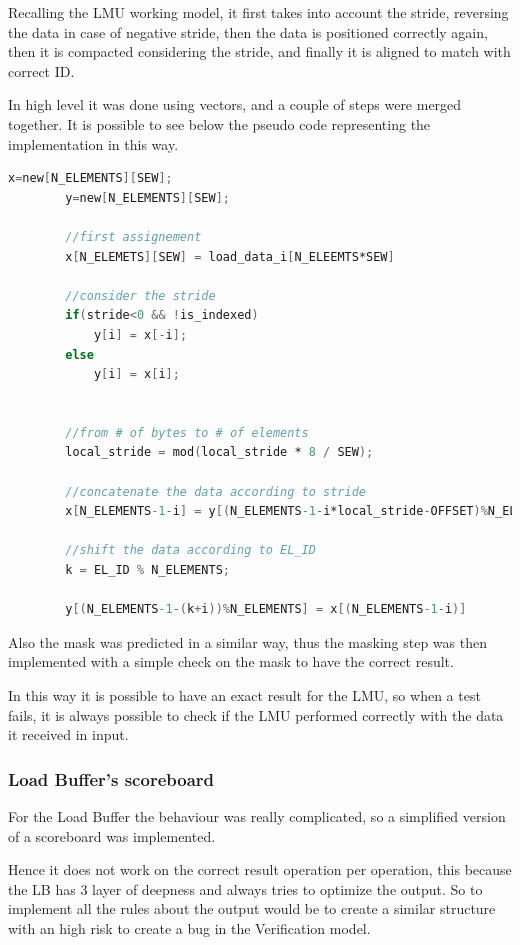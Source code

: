 Recalling the LMU working model, it first takes into account the stride, reversing the data in case of negative stride, then the data is positioned correctly again, then it is compacted considering the stride, and finally it is aligned to match with correct ID.

In high level it was done using vectors, and a couple of steps were merged together. It is possible to see below the pseudo code representing the implementation in this way.

\linespread{1}
\begin{lstlisting}[language=Verilog,style=verilog-style, backgroundcolor=\color{lyel_palette}, frame=tlb]
        x=new[N_ELEMENTS][SEW];
        y=new[N_ELEMENTS][SEW];

        //first assignement
        x[N_ELEMETS][SEW] = load_data_i[N_ELEEMTS*SEW]

        //consider the stride
        if(stride<0 && !is_indexed)
            y[i] = x[-i];
        else
            y[i] = x[i];
        

        //from # of bytes to # of elements
        local_stride = mod(local_stride * 8 / SEW);

        //concatenate the data according to stride 
        x[N_ELEMENTS-1-i] = y[(N_ELEMENTS-1-i*local_stride-OFFSET)%N_ELEMENTS];

        //shift the data according to EL_ID
        k = EL_ID % N_ELEMENTS;
        
        y[(N_ELEMENTS-1-(k+i))%N_ELEMENTS] = x[(N_ELEMENTS-1-i)]
\end{lstlisting}
\linespread{1.2}

Also the mask was predicted in a similar way, thus the masking step was then implemented with a simple check on the mask to have the correct result.

In this way it is possible to have an exact result for the LMU, so when a test fails, it is always possible to check if the LMU performed correctly with the data it received in input.

\subsubsection{Load Buffer's scoreboard}
For the Load Buffer the behaviour was really complicated, so a simplified  version of a scoreboard was implemented.

Hence it does not work on the correct result operation per operation, this because the LB has 3 layer of deepness and always tries to optimize the output. So to implement all the rules about the output would be to create a similar structure with an high risk to create a bug in the Verification model.

